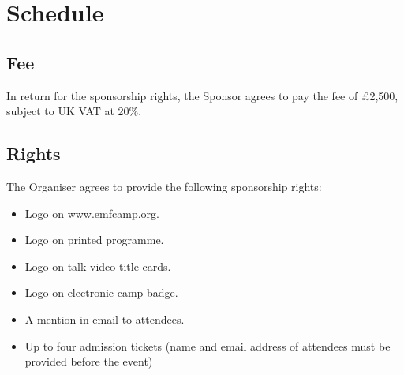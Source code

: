 \section*{Schedule}

\subsection*{Fee}

In return for the sponsorship rights, the Sponsor agrees to pay the fee of £2,500, subject to UK VAT at 20\%.

\subsection*{Rights}

The Organiser agrees to provide the following sponsorship rights:

\begin{itemize}
    \item Logo on www.emfcamp.org.
    \item Logo on printed programme.
    \item Logo on talk video title cards.
    \item Logo on electronic camp badge.
    \item A mention in email to attendees.
    \item Up to four admission tickets (name and email address of attendees must be provided before the event)
\end{itemize}
